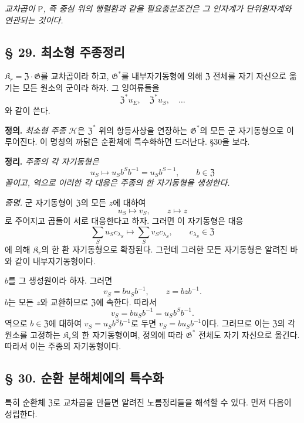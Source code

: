 \noindent\emph{교차곱이 \(\mathsf P\), 즉 중심 위의 행렬환과 같을 필요충분조건은 그 인자계가 단위원자계와 연관되는 것이다.}

\subsection*{§ 29. 최소형 주종정리}

\(\mathfrak K_r=\mathfrak Z\mathbin{\cdot}\mathfrak G\)를 교차곱이라 하고, \(\mathfrak G^*\)를 내부자기동형에 의해 \(\mathfrak Z\) 전체를 자기 자신으로 옮기는 모든 원소의 군이라 하자. 그 잉여류들을
\[
        \mathfrak Z^*u_E,
        \quad
        \mathfrak Z^*u_S,
        \quad\ldots
\]
와 같이 쓴다.

\noindent\textbf{정의.} \emph{최소형 주종} \(\mathscr H\)은 \(\mathfrak Z^*\) 위의 항등사상을 연장하는 \(\mathfrak G^*\)의 모든 군 자기동형으로 이루어진다. 이 명칭의 까닭은 순환체에 특수화하면 드러난다. §30을 보라.

\noindent\textbf{정리.} \emph{주종의 각 자기동형은}
\[
        u_S\longmapsto
        u_Sb^Sb^{-1}
        =u_Sb^{S-1},
        \qquad b\in\mathfrak Z
\]
\emph{꼴이고, 역으로 이러한 각 대응은 주종의 한 자기동형을 생성한다.}

\noindent\emph{증명.} 군 자기동형이 \(\mathfrak Z\)의 모든 \(z\)에 대하여
\[
        u_S\longmapsto v_S,
        \qquad
        z\longmapsto z
\]
로 주어지고 곱들이 서로 대응한다고 하자. 그러면 이 자기동형은 대응
\[
        \sum_Su_Sc_{\lambda_S}
        \longmapsto
        \sum_Sv_Sc_{\lambda_S},
        \qquad c_{\lambda_S}\in\mathfrak Z
\]
에 의해 \(\mathfrak K_r\)의 한 환 자기동형으로 확장된다. 그런데 그러한 모든 자기동형은 알려진 바와 같이 내부자기동형이다.

\(b\)를 그 생성원이라 하자. 그러면
\[
        v_S=bu_Sb^{-1},
        \qquad
        z=bzb^{-1}.
\]
\(b\)는 모든 \(z\)와 교환하므로 \(\mathfrak Z\)에 속한다. 따라서
\[
        v_S=bu_Sb^{-1}=u_Sb^Sb^{-1}.
\]
역으로 \(b\in\mathfrak Z\)에 대하여 \(v_S=u_Sb^Sb^{-1}\)로 두면 \(v_S=bu_Sb^{-1}\)이다. 그러므로 이는 \(\mathfrak Z\)의 각 원소를 고정하는 \(\mathfrak K_r\)의 한 자기동형이며, 정의에 따라 \(\mathfrak G^*\) 전체도 자기 자신으로 옮긴다. 따라서 이는 주종의 자기동형이다.

\subsection*{§ 30. 순환 분해체에의 특수화}

특히 순환체 \(\mathfrak Z\)로 교차곱을 만들면 알려진 노름정리들을 해석할 수 있다. 먼저 다음이 성립한다.

